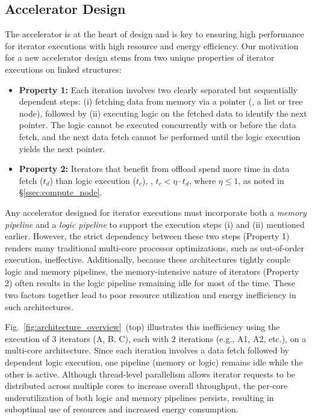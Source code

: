 \subsection{\pulse Accelerator Design}
\label{ssec:pulsearchitecture}

The accelerator is at the heart of \pulse design and is key to ensuring high performance for iterator executions with high resource and energy efficiency. Our motivation for a new accelerator design stems from two unique properties of iterator executions on linked structures: 



\begin{itemize}[leftmargin=*, itemsep=0pt]
  \item \textbf{Property 1:} Each iteration involves two clearly separated but sequentially dependent steps: (i) fetching data from memory via a pointer (\eg, a list or tree node), followed by (ii) executing logic on the fetched data to identify the next pointer. The logic cannot be executed concurrently with or before the data fetch, and the next data fetch cannot be performed until the logic execution yields the next pointer.
 
  \item \textbf{Property 2:} Iterators that benefit from offload spend more time in data fetch ($t_d$) than logic execution ($t_c$), \ie, $t_c < \eta \cdot t_d$, where $\eta \leq 1$, as noted in \S\ref{ssec:compute_node}. 
\end{itemize}

Any accelerator designed for iterator executions must incorporate both a \emph{memory pipeline} and a \emph{logic pipeline} to support the execution steps (i) and (ii) mentioned earlier. However, the strict dependency between these two steps (Property 1) renders many traditional multi-core processor optimizations, such as out-of-order execution, ineffective. Additionally, because these architectures tightly couple logic and memory pipelines, the memory-intensive nature of iterators (Property 2) often results in the logic pipeline remaining idle for most of the time. These two factors together lead to poor resource utilization and energy inefficiency in such architectures.

Fig.~\ref{fig:architecture_overview}~(top) illustrates this inefficiency using the execution of 3 iterators (A, B, C), each with $2$ iterations (e.g., A1, A2, etc.), on a multi-core architecture. Since each iteration involves a data fetch followed by dependent logic execution, one pipeline (memory or logic) remains idle while the other is active. Although thread-level parallelism allows iterator requests to be distributed across multiple cores to increase overall throughput, the per-core underutilization of both logic and memory pipelines persists, resulting in suboptimal use of resources and increased energy consumption.



